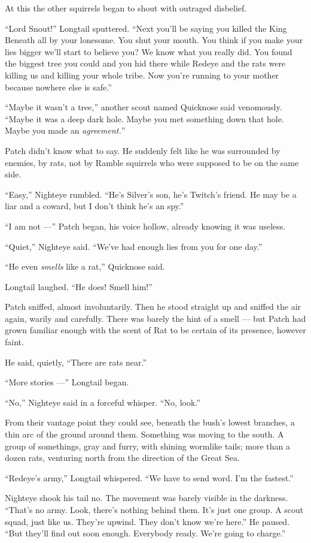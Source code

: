 \documentclass[ebook,oneside,openany,17pt]{memoir}
\begin{document}
At this the other squirrels began to shout with outraged disbelief.

“Lord Snout!” Longtail sputtered. “Next you’ll be saying you killed
the King Beneath all by your lonesome. You shut your mouth. You think
if you make your lies bigger we’ll start to believe you? We know what
you really did. You found the biggest tree you could and you hid there
while Redeye and the rats were killing us and killing your whole
tribe. Now you’re running to your mother because nowhere else is
safe.”

“Maybe it wasn’t a tree,” another scout named Quicknose said
venomously. “Maybe it was a deep dark hole. Maybe you met something
down that hole. Maybe you made an \emph{agreement.}”

Patch didn’t know what to say. He suddenly felt like he was surrounded
by enemies, by rats, not by Ramble squirrels who were supposed to be
on the same side.

“Easy,” Nighteye rumbled. “He’s Silver’s son, he’s Twitch’s friend. He
may be a liar and a coward, but I don’t think he’s an spy.”

“I am not —” Patch began, his voice hollow, already knowing it was
useless.

“Quiet,” Nighteye said. “We’ve had enough lies from you for one day.”

“He even \emph{smells} like a rat,” Quicknose said.

Longtail laughed. “He does! Smell him!”

Patch sniffed, almost involuntarily. Then he stood straight up and
sniffed the air again, warily and carefully. There was barely the hint
of a smell — but Patch had grown familiar enough with the scent of Rat
to be certain of its presence, however faint.

He said, quietly, “There are rats near.”

“More stories —” Longtail began.

“No,” Nighteye said in a forceful whisper. “No, look.”

From their vantage point they could see, beneath the bush’s lowest
branches, a thin arc of the ground around them. Something was moving
to the south. A group of somethings, gray and furry, with shining
wormlike tails; more than a dozen rats, venturing north from the
direction of the Great Sea.

“Redeye’s army,” Longtail whispered. “We have to send word. I’m the
fastest.”

Nighteye shook his tail no. The movement was barely visible in the
darkness. “That’s no army. Look, there’s nothing behind them. It’s
just one group. A scout squad, just like us. They’re upwind. They
don’t know we’re here.” He paused. “But they’ll find out soon
enough. Everybody ready. We’re going to charge.”
\end{document}
